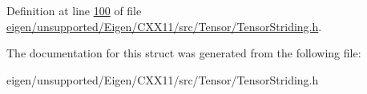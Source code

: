 Definition at line \hyperlink{eigen_2unsupported_2_eigen_2_c_x_x11_2src_2_tensor_2_tensor_striding_8h_source_l00100}{100} of file \hyperlink{eigen_2unsupported_2_eigen_2_c_x_x11_2src_2_tensor_2_tensor_striding_8h_source}{eigen/unsupported/\+Eigen/\+C\+X\+X11/src/\+Tensor/\+Tensor\+Striding.\+h}.



The documentation for this struct was generated from the following file\+:\begin{DoxyCompactItemize}
\item 
eigen/unsupported/\+Eigen/\+C\+X\+X11/src/\+Tensor/\+Tensor\+Striding.\+h\end{DoxyCompactItemize}
